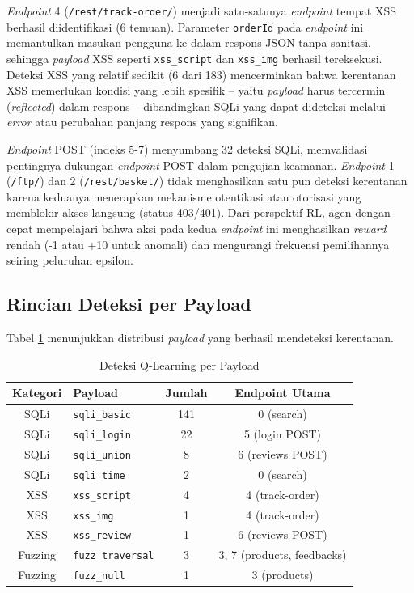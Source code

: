 \textit{Endpoint} 4 (\texttt{/rest/track-order/}) menjadi satu-satunya \textit{endpoint} tempat XSS berhasil diidentifikasi (6 temuan). Parameter \texttt{orderId} pada \textit{endpoint} ini memantulkan masukan pengguna ke dalam respons JSON tanpa sanitasi, sehingga \textit{payload} XSS seperti \texttt{xss\_script} dan \texttt{xss\_img} berhasil tereksekusi. Deteksi XSS yang relatif sedikit (6 dari 183) mencerminkan bahwa kerentanan XSS memerlukan kondisi yang lebih spesifik -- yaitu \textit{payload} harus tercermin (\textit{reflected}) dalam respons -- dibandingkan SQLi yang dapat dideteksi melalui \textit{error} atau perubahan panjang respons yang signifikan.

\textit{Endpoint} POST (indeks 5-7) menyumbang 32 deteksi SQLi, memvalidasi pentingnya dukungan \textit{endpoint} POST dalam pengujian keamanan. \textit{Endpoint} 1 (\texttt{/ftp/}) dan 2 (\texttt{/rest/basket/}) tidak menghasilkan satu pun deteksi kerentanan karena keduanya menerapkan mekanisme otentikasi atau otorisasi yang memblokir akses langsung (status 403/401). Dari perspektif RL, agen dengan cepat mempelajari bahwa aksi pada kedua \textit{endpoint} ini menghasilkan \textit{reward} rendah (-1 atau +10 untuk anomali) dan mengurangi frekuensi pemilihannya seiring peluruhan epsilon.

\subsection{Rincian Deteksi per Payload}

Tabel \ref{tab:ql_per_payload} menunjukkan distribusi \textit{payload} yang berhasil mendeteksi kerentanan.

\begin{table}[H]
\centering
\caption{Deteksi Q-Learning per Payload}
\label{tab:ql_per_payload}
\begin{tabular}{|c|l|c|c|}
\hline
\textbf{Kategori} & \textbf{Payload} & \textbf{Jumlah} & \textbf{Endpoint Utama} \\
\hline
SQLi & \texttt{sqli\_basic} & 141 & 0 (search) \\
SQLi & \texttt{sqli\_login} & 22 & 5 (login POST) \\
SQLi & \texttt{sqli\_union} & 8 & 6 (reviews POST) \\
SQLi & \texttt{sqli\_time} & 2 & 0 (search) \\
XSS & \texttt{xss\_script} & 4 & 4 (track-order) \\
XSS & \texttt{xss\_img} & 1 & 4 (track-order) \\
XSS & \texttt{xss\_review} & 1 & 6 (reviews POST) \\
Fuzzing & \texttt{fuzz\_traversal} & 3 & 3, 7 (products, feedbacks) \\
Fuzzing & \texttt{fuzz\_null} & 1 & 3 (products) \\
\hline
\end{tabular}
\end{table}

